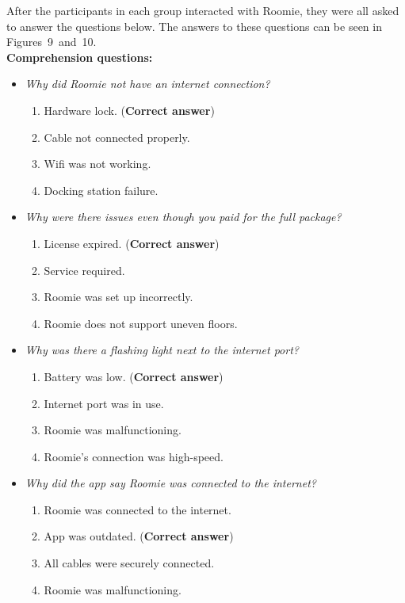 \documentclass{article}
\begin{document}
After the participants in each group interacted with Roomie, they were all asked to answer the questions below. The answers to these questions can be seen in Figures~9~and~10. \\

\noindent \textbf{Comprehension questions:}
\begin{itemize}
\item[Q1.] \textit{Why did Roomie not have an internet connection?}
\begin{enumerate}

    \item Hardware lock. (\textbf{Correct answer})
    \item Cable not connected properly.
    \item Wifi was not working.
    \item Docking station failure.
\end{enumerate}
\item[Q2.] \textit{Why were there issues even though you paid for the full package?}
\begin{enumerate}
    \item License expired. (\textbf{Correct answer})
    \item Service required.
    \item Roomie was set up incorrectly.
    \item Roomie does not support uneven floors.
\end{enumerate}
\item[Q3.] \textit{Why was there a flashing light next to the internet port?}
\begin{enumerate}
    \item Battery was low. (\textbf{Correct answer})
    \item Internet port was in use.
    \item Roomie was malfunctioning.
    \item Roomie's connection was high-speed.
\end{enumerate}

\item[Q4.] \textit{Why did the app say Roomie was connected to the internet?}
\begin{enumerate}
    \item Roomie was connected to the internet.
    \item App was outdated. (\textbf{Correct answer})
    \item All cables were securely connected.
    \item Roomie was malfunctioning.
\end{enumerate}
\end{itemize}
\end{document}
